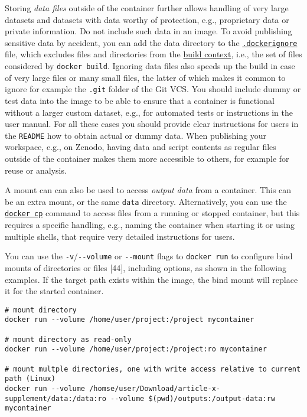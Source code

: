 \documentclass[10pt,letterpaper]{article}
\begin{document}
Storing \emph{data files} outside of the container further allows
handling of very large datasets and datasets with data worthy of
protection, e.g., proprietary data or private information. Do not
include such data in an image. To avoid publishing sensitive data by
accident, you can add the data directory to the
\href{https://docs.docker.com/engine/reference/commandline/build/\#use-a-dockerignore-file}{\texttt{.dockerignore}}
file, which excludes files and directories from the
\href{https://docs.docker.com/engine/reference/commandline/build/\#extended-description}{build
context}, i.e., the set of files considered by \texttt{docker\ build}.
Ignoring data files also speeds up the build in case of very large files
or many small files, the latter of which makes it common to ignore for
example the \texttt{.git} folder of the Git VCS. You should include
dummy or test data into the image to be able to ensure that a container
is functional without a larger custom dataset, e.g., for automated tests
or instructions in the user manual. For all these cases you should
provide clear instructions for users in the \texttt{README} how to
obtain actual or dummy data. When publishing your workspace, e.g., on
Zenodo, having data and script contents as regular files outside of the
container makes them more accessible to others, for example for reuse or
analysis.

A mount can can also be used to access \emph{output data} from a
container. This can be an extra mount, or the same \texttt{data}
directory. Alternatively, you can use the
\href{https://docs.docker.com/engine/reference/commandline/cp/}{\texttt{docker\ cp}}
command to access files from a running or stopped container, but this
requires a specific handling, e.g., naming the container when starting
it or using multiple shells, that require very detailed instructions for
users.

You can use the \texttt{-v}/\texttt{-\/-volume} or \texttt{-\/-mount}
flags to \texttt{docker\ run} to configure bind mounts of directories or
files {[}44{]}, including options, as shown in the following examples.
If the target path exists within the image, the bind mount will replace
it for the started container.

\begin{verbatim}
# mount directory
docker run --volume /home/user/project:/project mycontainer

# mount directory as read-only
docker run --volume /home/user/project:/project:ro mycontainer

# mount multple directories, one with write access relative to current path (Linux)
docker run --volume /homse/user/Download/article-x-supplement/data:/data:ro --volume $(pwd)/outputs:/output-data:rw mycontainer
\end{verbatim}
\end{document}
